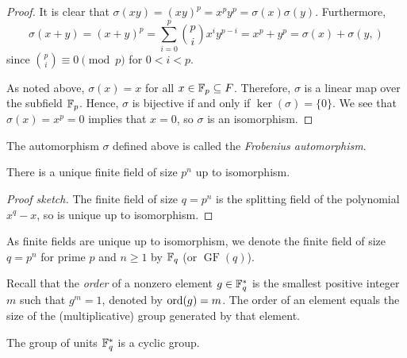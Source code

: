 \documentclass[../main.tex]{subfiles}
\begin{document}
\begin{proof}
It is clear that $\sigma(xy) = (xy)^p = x^p y^p = \sigma(x)\sigma(y)$. Furthermore,
\begin{equation*}
    \sigma(x + y) = (x + y)^p = \sum_{i=0}^p \binom{p}{i}x^i y^{p-i} = x^p + y^p = \sigma(x) + \sigma(y,)
\end{equation*}
since $\binom{p}{i} \equiv 0 \pmod p$ for $0 < i < p$.

As noted above, $\sigma(x) = x$ for all $x \in \mathbb{F}_p \subseteq F$. Therefore, $\sigma$ is a linear map over the subfield $\mathbb{F}_p$. Hence, $\sigma$ is bijective if and only if $\ker(\sigma) = \{0\}$. We see that $\sigma(x) = x^p = 0$ implies that $x = 0$, so $\sigma$ is an isomorphism.
\end{proof}

The automorphism $\sigma$ defined above is called the \emph{Frobenius automorphism}.

\begin{theorem}
There is a unique finite field of size $p^n$ up to isomorphism.
\end{theorem}

\begin{proof}[Proof sketch]
The finite field of size $q = p^n$ is the splitting field of the polynomial $x^q - x$, so is unique up to isomorphism.
\end{proof}

As finite fields are unique up to isomorphism, we denote the finite field of size $q = p^n$ for prime $p$ and $n \geq 1$ by $\mathbb{F}_q$ (or $\operatorname{GF}(q)$).

Recall that the \emph{order} of a nonzero element $g \in \mathbb{F}_q^*$ is the smallest positive integer $m$ such that $g^m = 1$, denoted by $\operatorname{ord}(g) = m$. The order of an element equals the size of the (multiplicative) group generated by that element.

\begin{theorem}
The group of units $\mathbb{F}_q^*$ is a cyclic group.
\end{theorem}
\end{document}
